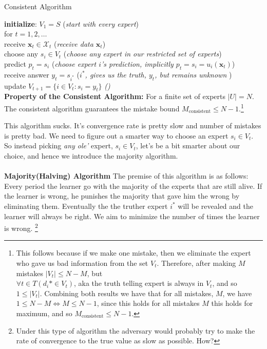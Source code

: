 \documentclass[11pt]{article}
\newcommand\tab[1][1cm]{\hspace*{#1}}
\theoremstyle{quest}
\begin{document}
\begin{tcolorbox}
\begin{center}Consistent Algorithm\end{center}
\textbf{initialize}: $V_1 = S$ (\textit{start with every expert}) \\ 
for $t = 1, 2, \dots $\\
\tab receive $\mathbf{x}_t \in \mathcal{X}_t $ (\textit{receive data $\mathbf{x}_t$}) \\
\tab choose any $s_i \in V_t$ (\textit{choose any expert in our restricted set of experts}) \\
\tab predict $p_t = s_i$ (\textit{choose expert $i$'s prediction, implicitly $p_t = s_i = u_i(\mathbf{x}_t)$})\\
\tab receive answer $y_t = s_{i^*}$ (\textit{$i^*$, gives us the truth, $y_t$, but remains unknown })\\
\tab update $V_{t+1} = \{i\in V_t: s_i = y_t\}$ \textit{()} \\ 

\textbf{Property of the Consistent Algorithm:} For a finite set of experts $|U|=N$. The consistent algorithm guarantees the mistake bound $M_\text{consistent}\le N-1$.\footnote{This follows because if we make one mistake, then we eliminate the expert who gave us bad information from the set $V_t$. Therefore, after making $M$ mistakes $|V_t| \le N - M$, but \\$\forall t\in T(d_i*\in V_t)$, aka the truth telling expert is always in $V_t$, and so $1\le |V_t|$. Combining both results we have that for all mistakes, $M$, we have  $1\le N-M \iff M\le N-1$, since this holds for all mistakes $M$ this holds for maximum, and so $M_\text{consistent}\le N-1$.}
\end{tcolorbox}
This algorithm sucks. It's convergence rate is pretty slow and number of mistakes is pretty bad. We need to figure out a smarter way to choose an expert $s_i \in V_t$. So instead picking \textit{any ole'} expert, $s_i \in V_t$, let's be a bit smarter about our choice, and hence we introduce the majority algorithm. \\ \\ 
\textbf{Majority(Halving) Algorithm} The premise of this algorithm is as follows: Every period the learner go with the majority of the experts that are still alive. If the learner is wrong, he punishes the majority that gave him the wrong by eliminating them. Eventually the the truther expert $i^*$ will be revealed and the learner will always be right. We aim to minimize the number of times the learner is wrong. \footnote{Under this type of algorithm the adversary would probably try to make the rate of convergence to the true value as slow as possible. How?}
\end{document}
